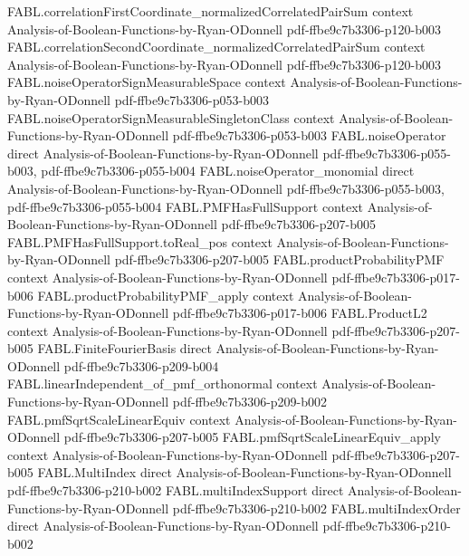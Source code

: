 \begin{theorem}
\proofstep
  {FABL.correlationFirstCoordinate_normalizedCorrelatedPairSum}
  {context}
  {Analysis-of-Boolean-Functions-by-Ryan-ODonnell}
  {pdf-ffbe9c7b3306-p120-b003}
\proofstep
  {FABL.correlationSecondCoordinate_normalizedCorrelatedPairSum}
  {context}
  {Analysis-of-Boolean-Functions-by-Ryan-ODonnell}
  {pdf-ffbe9c7b3306-p120-b003}
\proofstep
  {FABL.noiseOperatorSignMeasurableSpace}
  {context}
  {Analysis-of-Boolean-Functions-by-Ryan-ODonnell}
  {pdf-ffbe9c7b3306-p053-b003}
\proofstep
  {FABL.noiseOperatorSignMeasurableSingletonClass}
  {context}
  {Analysis-of-Boolean-Functions-by-Ryan-ODonnell}
  {pdf-ffbe9c7b3306-p053-b003}
\proofstep
  {FABL.noiseOperator}
  {direct}
  {Analysis-of-Boolean-Functions-by-Ryan-ODonnell}
  {pdf-ffbe9c7b3306-p055-b003,
    pdf-ffbe9c7b3306-p055-b004}
\proofstep
  {FABL.noiseOperator_monomial}
  {direct}
  {Analysis-of-Boolean-Functions-by-Ryan-ODonnell}
  {pdf-ffbe9c7b3306-p055-b003,
    pdf-ffbe9c7b3306-p055-b004}
\proofstep
  {FABL.PMFHasFullSupport}
  {context}
  {Analysis-of-Boolean-Functions-by-Ryan-ODonnell}
  {pdf-ffbe9c7b3306-p207-b005}
\proofstep
  {FABL.PMFHasFullSupport.toReal_pos}
  {context}
  {Analysis-of-Boolean-Functions-by-Ryan-ODonnell}
  {pdf-ffbe9c7b3306-p207-b005}
\proofstep
  {FABL.productProbabilityPMF}
  {context}
  {Analysis-of-Boolean-Functions-by-Ryan-ODonnell}
  {pdf-ffbe9c7b3306-p017-b006}
\proofstep
  {FABL.productProbabilityPMF_apply}
  {context}
  {Analysis-of-Boolean-Functions-by-Ryan-ODonnell}
  {pdf-ffbe9c7b3306-p017-b006}
\proofstep
  {FABL.ProductL2}
  {context}
  {Analysis-of-Boolean-Functions-by-Ryan-ODonnell}
  {pdf-ffbe9c7b3306-p207-b005}
\proofstep
  {FABL.FiniteFourierBasis}
  {direct}
  {Analysis-of-Boolean-Functions-by-Ryan-ODonnell}
  {pdf-ffbe9c7b3306-p209-b004}
\proofstep
  {FABL.linearIndependent_of_pmf_orthonormal}
  {context}
  {Analysis-of-Boolean-Functions-by-Ryan-ODonnell}
  {pdf-ffbe9c7b3306-p209-b002}
\proofstep
  {FABL.pmfSqrtScaleLinearEquiv}
  {context}
  {Analysis-of-Boolean-Functions-by-Ryan-ODonnell}
  {pdf-ffbe9c7b3306-p207-b005}
\proofstep
  {FABL.pmfSqrtScaleLinearEquiv_apply}
  {context}
  {Analysis-of-Boolean-Functions-by-Ryan-ODonnell}
  {pdf-ffbe9c7b3306-p207-b005}
\proofstep
  {FABL.MultiIndex}
  {direct}
  {Analysis-of-Boolean-Functions-by-Ryan-ODonnell}
  {pdf-ffbe9c7b3306-p210-b002}
\proofstep
  {FABL.multiIndexSupport}
  {direct}
  {Analysis-of-Boolean-Functions-by-Ryan-ODonnell}
  {pdf-ffbe9c7b3306-p210-b002}
\proofstep
  {FABL.multiIndexOrder}
  {direct}
  {Analysis-of-Boolean-Functions-by-Ryan-ODonnell}
  {pdf-ffbe9c7b3306-p210-b002}
\proofstep

\end{theorem}
